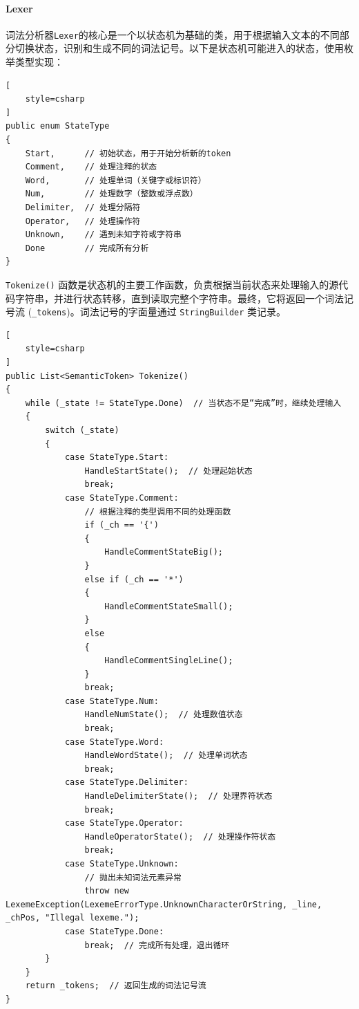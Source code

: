 \documentclass[../main.tex]{subfiles}
\begin{document}
\paragraph{Lexer} 词法分析器\texttt{Lexer}的核心是一个以状态机为基础的类，用于根据输入文本的不同部分切换状态，识别和生成不同的词法记号。以下是状态机可能进入的状态，使用枚举类型实现：

\begin{lstlisting}[
    style=csharp
]
public enum StateType
{
    Start,      // 初始状态，用于开始分析新的token
    Comment,    // 处理注释的状态
    Word,       // 处理单词（关键字或标识符）
    Num,        // 处理数字（整数或浮点数）
    Delimiter,  // 处理分隔符
    Operator,   // 处理操作符
    Unknown,    // 遇到未知字符或字符串
    Done        // 完成所有分析
}
\end{lstlisting}

\texttt{Tokenize()} 函数是状态机的主要工作函数，负责根据当前状态来处理输入的源代码字符串，并进行状态转移，直到读取完整个字符串。最终，它将返回一个词法记号流 (\texttt{\_tokens})。词法记号的字面量通过 \texttt{StringBuilder} 类记录。

\begin{lstlisting}[
    style=csharp
]
public List<SemanticToken> Tokenize()
{
    while (_state != StateType.Done)  // 当状态不是“完成”时，继续处理输入
    {
        switch (_state)
        {
            case StateType.Start:
                HandleStartState();  // 处理起始状态
                break;
            case StateType.Comment:
                // 根据注释的类型调用不同的处理函数
                if (_ch == '{')
                {
                    HandleCommentStateBig();
                }
                else if (_ch == '*')
                {
                    HandleCommentStateSmall();
                }
                else
                {
                    HandleCommentSingleLine();
                }
                break;
            case StateType.Num:
                HandleNumState();  // 处理数值状态
                break;
            case StateType.Word:
                HandleWordState();  // 处理单词状态
                break;
            case StateType.Delimiter:
                HandleDelimiterState();  // 处理界符状态
                break;
            case StateType.Operator:
                HandleOperatorState();  // 处理操作符状态
                break;
            case StateType.Unknown:
                // 抛出未知词法元素异常
                throw new LexemeException(LexemeErrorType.UnknownCharacterOrString, _line, _chPos, "Illegal lexeme.");
            case StateType.Done:
                break;  // 完成所有处理，退出循环
        }
    }
    return _tokens;  // 返回生成的词法记号流
}
\end{lstlisting}
\end{document}
